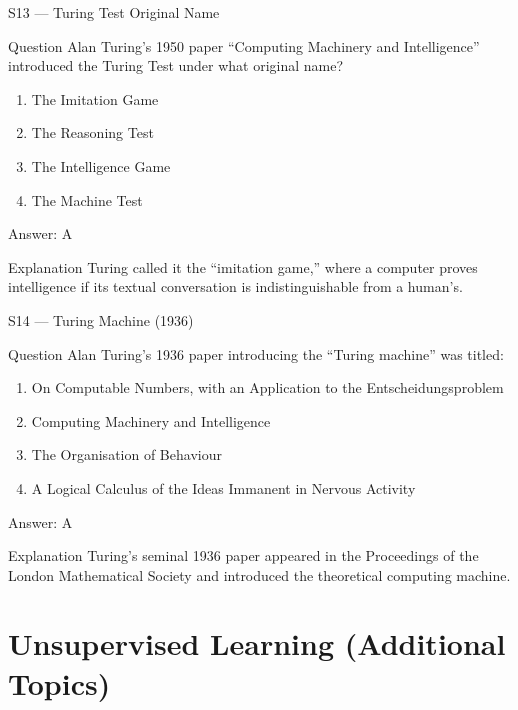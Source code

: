 \documentclass[aspectratio=169,8pt]{beamer}
\begin{document}
	\begin{frame}{S13 --- Turing Test Original Name}
		\begin{block}{Question}
			Alan Turing's 1950 paper ``Computing Machinery and Intelligence'' introduced the Turing Test under what original name?
			\begin{enumerate}
				\item The Imitation Game
				\item The Reasoning Test
				\item The Intelligence Game
				\item The Machine Test
			\end{enumerate}
		\end{block}
		\begin{exampleblock}{Answer: A}\end{exampleblock}
		\begin{block}{Explanation}
			Turing called it the ``imitation game,'' where a computer proves intelligence if its textual conversation is indistinguishable from a human's.
		\end{block}
	\end{frame}
	
	\begin{frame}{S14 --- Turing Machine (1936)}
		\begin{block}{Question}
			Alan Turing's 1936 paper introducing the ``Turing machine'' was titled:
			\begin{enumerate}
				\item On Computable Numbers, with an Application to the Entscheidungsproblem
				\item Computing Machinery and Intelligence
				\item The Organisation of Behaviour
				\item A Logical Calculus of the Ideas Immanent in Nervous Activity
			\end{enumerate}
		\end{block}
		\begin{exampleblock}{Answer: A}\end{exampleblock}
		\begin{block}{Explanation}
			Turing's seminal 1936 paper appeared in the Proceedings of the London Mathematical Society and introduced the theoretical computing machine.
		\end{block}
	\end{frame}
	
	\section{Unsupervised Learning (Additional Topics)}
	
\end{document}
